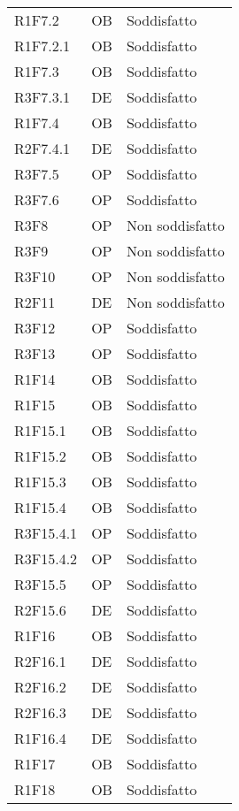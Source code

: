 {\begin{longtable}{C{2.5cm} C{2cm} C{3.5cm}}
R1F7.2 & OB & Soddisfatto\\
R1F7.2.1 & OB & Soddisfatto\\
R1F7.3 & OB & Soddisfatto\\
R3F7.3.1 & DE & Soddisfatto\\
R1F7.4 &  OB & Soddisfatto\\
R2F7.4.1 & DE & Soddisfatto\\
R3F7.5 & OP & Soddisfatto\\
R3F7.6 & OP & Soddisfatto\\
R3F8 & OP & Non soddisfatto\\
R3F9 & OP & Non soddisfatto\\
R3F10 & OP & Non soddisfatto\\
R2F11 & DE & Non soddisfatto\\
R3F12 & OP & Soddisfatto\\
R3F13 & OP & Soddisfatto\\
R1F14 & OB & Soddisfatto\\
R1F15 & OB & Soddisfatto\\
R1F15.1 & OB & Soddisfatto\\
R1F15.2 & OB & Soddisfatto\\
R1F15.3 & OB & Soddisfatto\\
R1F15.4 & OB & Soddisfatto\\
R3F15.4.1 & OP & Soddisfatto\\
R3F15.4.2 & OP & Soddisfatto\\
R3F15.5 & OP & Soddisfatto\\
R2F15.6 & DE & Soddisfatto\\
R1F16 & OB & Soddisfatto\\ 
R2F16.1 & DE & Soddisfatto\\
R2F16.2 & DE & Soddisfatto\\
R2F16.3 & DE & Soddisfatto\\
R1F16.4 & DE & Soddisfatto \\
R1F17 & OB & Soddisfatto\\
R1F18 & OB & Soddisfatto\\

\end{longtable}
}	